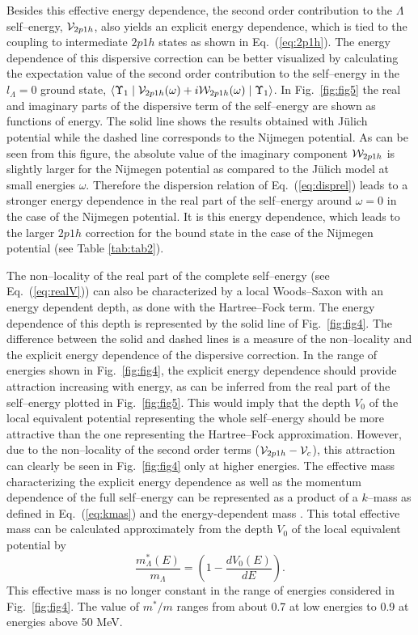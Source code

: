 Besides this effective energy dependence, the second order contribution
to the $\Lambda$ self--energy, ${\cal V}_{2p1h}$, also yields an explicit
energy dependence,
which is tied to the coupling to intermediate $2p1h$ states
as shown in Eq.\ (\ref{eq:2p1h}).
The energy dependence of this dispersive correction can be
better visualized by calculating
the expectation value of the second order contribution to the
self--energy in the $l_{\Lambda}=0$
ground state,
$\langle \Upsilon_1 \mid {\cal V}_{2p1h} (\omega) + i
{\cal W}_{2p1h}(\omega) \mid
\Upsilon_1 \rangle $.
In Fig.\ \ref{fig:fig5}
the real and imaginary parts
of the dispersive term of the self--energy 
are shown as functions of energy.
The solid line
shows the results obtained with J\"ulich potential while the dashed
line corresponds to the Nijmegen potential.
As can be seen from this
figure, the absolute value of the imaginary component ${\cal W}_{2p1h}$
is slightly larger for the Nijmegen potential as compared to the
J\"ulich model at small energies $\omega$. Therefore the dispersion
relation of Eq.\ (\ref{eq:disprel}) leads to a stronger energy dependence
in the real part of the self--energy around $\omega = 0$ in the case of
the Nijmegen potential. It is this energy dependence, which leads to
the larger $2p1h$ correction for the bound state in the case of the
Nijmegen potential (see Table \ref{tab:tab2}).

The non--locality of the real part of the complete self--energy (see
Eq.\ (\ref{eq:realV}))
can also be characterized by a local Woods--Saxon with an energy
dependent depth, as
done with the Hartree--Fock term. The energy dependence of this
depth
is represented by the solid line of Fig.\ \ref{fig:fig4}.
The difference between the solid and dashed lines is a measure of
the non--locality and the explicit energy dependence of the dispersive
correction. In the range of energies shown in Fig.\ \ref{fig:fig4}, the
explicit energy dependence should provide attraction increasing with
energy, as can be inferred from the real part of the self--energy plotted
in Fig.\ \ref{fig:fig5}. This would imply that the depth $V_{0}$ of the
local equivalent potential representing the whole self--energy should be
more attractive than the one representing the Hartree--Fock
approximation. However, due to the non--locality of the second order
terms (${\cal V}_{2p1h}-{\cal V}_c$), this attraction can clearly be
seen in Fig.\ \ref{fig:fig4} only at higher energies.
The effective mass characterizing the explicit energy dependence as
well as the momentum dependence of the full self--energy can be
represented as a product of a $k$--mass as defined in Eq.\
(\ref{eq:kmas}) and the energy-dependent mass \cite{ms91}.
This total effective mass can be calculated approximately from the
depth $V_{0}$ of the local equivalent potential by
\begin{equation}
     \frac{m^*_{\Lambda}(E)}{m_{\Lambda}} =
\left(1-\frac{dV_{0}(E)}{dE}\right).
\end{equation}
This effective mass is no longer constant in the range of energies
considered in Fig.\ \ref{fig:fig4}. The value of $m^*/m$ ranges from
about 0.7 at low energies to 0.9 at energies above 50 MeV.

